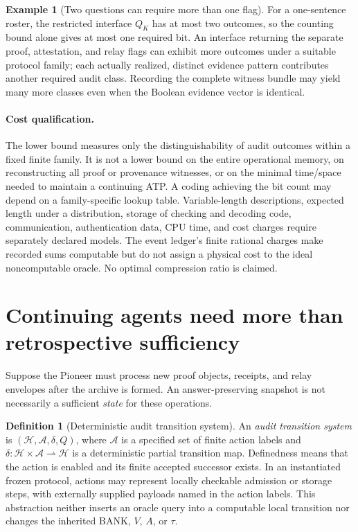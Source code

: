 \documentclass[11pt,letterpaper]{article}
\theoremstyle{definition}
\newtheorem{definition}[theorem]{Definition}
\newtheorem{example}[theorem]{Example}
\newcommand{\Hh}{\mathcal H}
\newcommand{\Act}{\mathcal A}
\begin{document}
\begin{example}[Two questions can require more than one flag]
For a one-sentence roster, the restricted interface $Q_K$ has at most two outcomes, so the counting bound alone gives at most one required bit. An interface returning the separate proof, attestation, and relay flags can exhibit more outcomes under a suitable protocol family; each actually realized, distinct evidence pattern contributes another required audit class. Recording the complete witness bundle may yield many more classes even when the Boolean evidence vector is identical.
\end{example}

\paragraph{Cost qualification.} The lower bound measures only the distinguishability of audit outcomes within a fixed finite family. It is not a lower bound on the entire operational memory, on reconstructing all proof or provenance witnesses, or on the minimal time/space needed to maintain a continuing ATP. A coding achieving the bit count may depend on a family-specific lookup table. Variable-length descriptions, expected length under a distribution, storage of checking and decoding code, communication, authentication data, CPU time, and cost charges require separately declared models. The event ledger's finite rational charges make recorded sums computable but do not assign a physical cost to the ideal noncomputable oracle. No optimal compression ratio is claimed.

\section{Continuing agents need more than retrospective sufficiency}
Suppose the Pioneer must process new proof objects, receipts, and relay envelopes after the archive is formed. An answer-preserving snapshot is not necessarily a sufficient \emph{state} for these operations.

\begin{definition}[Deterministic audit transition system]\label{def:trans}
An \emph{audit transition system} is $(\Hh,\Act,\delta,Q)$, where $\Act$ is a specified set of finite action labels and $\delta:\Hh\times\Act\rightharpoonup\Hh$ is a deterministic partial transition map. Definedness means that the action is enabled and its finite accepted successor exists. In an instantiated frozen protocol, actions may represent locally checkable admission or storage steps, with externally supplied payloads named in the action labels. This abstraction neither inserts an oracle query into a computable local transition nor changes the inherited BANK, $V$, $A$, or $\tau$.
\end{definition}
\end{document}
